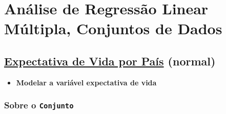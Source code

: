 \documentclass[11pt]{article}
\date{\today}
\title{}
\begin{document}
\tableofcontents
\clearpage


\section{Análise de Regressão Linear Múltipla, Conjuntos de Dados}
\label{sec:orgc833057}
\subsection{\href{https://www.kaggle.com/augustus0498/life-expectancy-who}{Expectativa de Vida por País} (normal)}
\label{sec:org7c78e95}
\begin{itemize}
\item \textbf{Modelar a variável expectativa de vida}
\end{itemize}
\subsubsection{Sobre o \texttt{Conjunto}}
\label{sec:orgb7f91b0}
\end{document}

